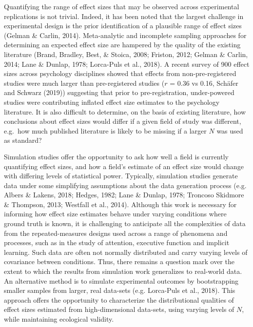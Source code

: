 \documentclass[
  man]{apa6}
\begin{document}
Quantifying the range of effect sizes that may be observed across experimental replications is not trivial. Indeed, it has been noted that the largest challenge in experimental design is the prior identification of a plausible range of effect sizes (Gelman \& Carlin, 2014). Meta-analytic and incomplete sampling approaches for determining an expected effect size are hampered by the quality of the existing literature (Brand, Bradley, Best, \& Stoica, 2008; Friston, 2012; Gelman \& Carlin, 2014; Lane \& Dunlap, 1978; Lorca-Puls et al., 2018). A recent survey of 900 effect sizes across psychology disciplines showed that effects from non-pre-registered studies were much larger than pre-registered studies (\(r\) = 0.36 vs 0.16, Schäfer and Schwarz (2019)) suggesting that prior to pre-registration, under-powered studies were contributing inflated effect size estimates to the psychology literature. It is also difficult to determine, on the basis of existing literature, how conclusions about effect sizes would differ if a given field of study was different, e.g.~how much published literature is likely to be missing if a larger \(N\) was used as standard?

Simulation studies offer the opportunity to ask how well a field is currently quantifying effect sizes, and how a field's estimate of an effect size would change with differing levels of statistical power. Typically, simulation studies generate data under some simplifying assumptions about the data generation process (e.g. Albers \& Lakens, 2018; Hedges, 1982; Lane \& Dunlap, 1978; Troncoso Skidmore \& Thompson, 2013; Westfall et al., 2014). Although this work is necessary for informing how effect size estimates behave under varying conditions where ground truth is known, it is challenging to anticipate all the complexities of data from the repeated-measures designs used across a range of phenomena and processes, such as in the study of attention, executive function and implicit learning. Such data are often not normally distributed and carry varying levels of covariance between conditions. Thus, there remains a question mark over the extent to which the results from simulation work generalizes to real-world data. An alternative method is to simulate experimental outcomes by bootstrapping smaller samples from larger, real data-sets (e.g. Lorca-Puls et al., 2018). This approach offers the opportunity to characterize the distributional qualities of effect sizes estimated from high-dimensional data-sets, using varying levels of \(N\), while maintaining ecological validity.
\end{document}
